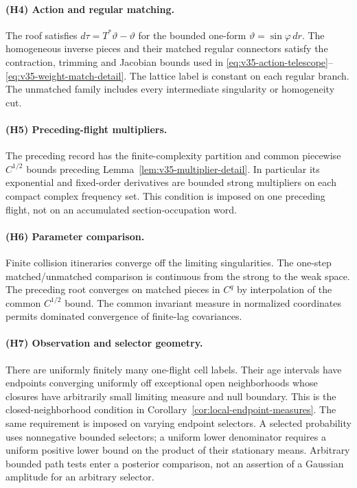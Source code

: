 \paragraph{(H4) Action and regular matching.}
The roof satisfies $d\tau=T^*\vartheta-\vartheta$ for the bounded
one-form $\vartheta=\sin\varphi\,dr$. The homogeneous inverse pieces
and their matched regular connectors satisfy the contraction,
trimming and Jacobian bounds used in
\eqref{eq:v35-action-telescope}--\eqref{eq:v35-weight-match-detail}.
The lattice label is constant on each regular branch. The unmatched
family includes every intermediate singularity or homogeneity cut.

\paragraph{(H5) Preceding-flight multipliers.}
The preceding record has the finite-complexity partition and common
piecewise $C^{1/2}$ bounds preceding
Lemma~\ref{lem:v35-multiplier-detail}. In particular its exponential
and fixed-order derivatives are bounded strong multipliers on each
compact complex frequency set. This condition is imposed on one
preceding flight, not on an accumulated section-occupation word.

\paragraph{(H6) Parameter comparison.}
Finite collision itineraries converge off the limiting singularities.
The one-step matched/unmatched comparison is continuous from the
strong to the weak space. The preceding root converges on matched
pieces in $C^q$ by interpolation of the common $C^{1/2}$ bound.
The common invariant measure in normalized coordinates permits
dominated convergence of finite-lag covariances.

\paragraph{(H7) Observation and selector geometry.}
There are uniformly finitely many one-flight cell labels. Their age
intervals have endpoints converging uniformly off exceptional open
neighborhoods whose closures have arbitrarily small limiting measure
and null boundary. This is the closed-neighborhood condition in
Corollary~\ref{cor:local-endpoint-measures}. The same requirement is
imposed on varying endpoint selectors. A selected probability uses
nonnegative bounded selectors; a uniform lower denominator requires
a uniform positive lower bound on the product of their stationary
means. Arbitrary bounded path tests enter a posterior comparison,
not an assertion of a Gaussian amplitude for an arbitrary selector.

